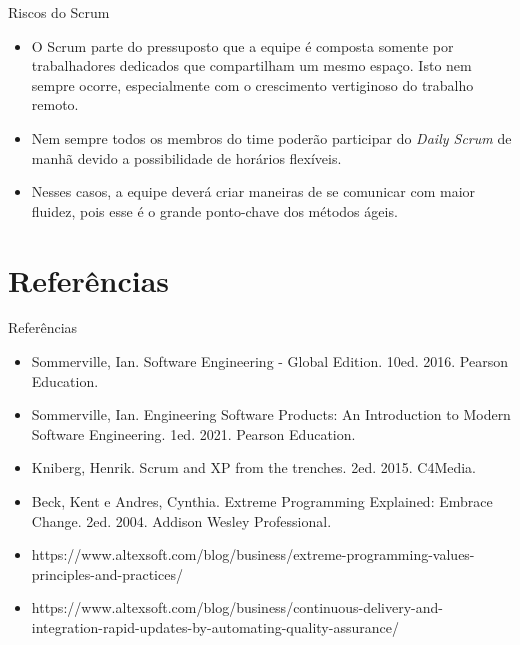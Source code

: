 \documentclass[11pt]{beamer}
\begin{document}
    \begin{frame}{Riscos do Scrum}
      \begin{itemize}
         \item O Scrum parte do pressuposto que a equipe é composta somente por trabalhadores dedicados que compartilham um mesmo espaço. Isto nem sempre ocorre, especialmente com o crescimento vertiginoso do trabalho remoto.
         \item Nem sempre todos os membros do time poderão participar do \textit{Daily Scrum} de manhã devido a possibilidade de horários flexíveis.
         \item Nesses casos, a equipe deverá criar maneiras de se comunicar com maior fluidez, pois esse é o grande ponto-chave dos métodos ágeis.
      \end{itemize}
    \end{frame}

    \section{Referências}

    \begin{frame}{Referências}
      \begin{itemize}
        \item Sommerville, Ian. Software Engineering - Global Edition. 10ed. 2016. Pearson Education.
        \item Sommerville, Ian. Engineering Software Products: An Introduction to Modern Software Engineering. 1ed. 2021. Pearson Education.
        \item Kniberg, Henrik. Scrum and XP from the trenches. 2ed. 2015. C4Media.
        \item Beck, Kent e Andres, Cynthia. Extreme Programming Explained: Embrace Change. 2ed. 2004. Addison Wesley Professional.
        \item https://www.altexsoft.com/blog/business/extreme-programming-values-principles-and-practices/
        \item https://www.altexsoft.com/blog/business/continuous-delivery-and-integration-rapid-updates-by-automating-quality-assurance/
      \end{itemize}
    \end{frame}
\end{document}
